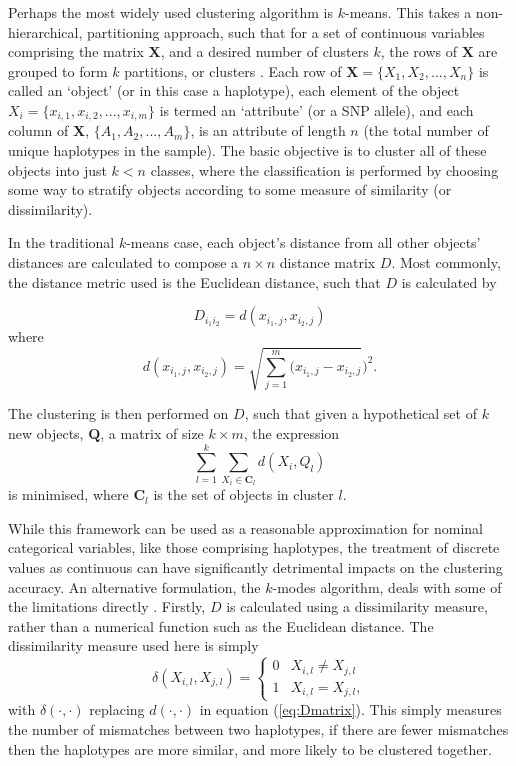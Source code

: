 Perhaps the most widely used clustering algorithm is $k$-means. This takes a non-hierarchical, partitioning approach, such that for a set of continuous variables comprising the matrix $\mathbf{X}$, and a desired number of clusters $k$, the rows of $\mathbf{X}$ are grouped to form $k$ partitions, or clusters \citep{MacQueen1967}. Each row of $\mathbf{X} = \{X_1, X_2, ... , X_n \}$ is called an `object' (or in this case a haplotype), each element of the object $X_i = \{x_{i, 1}, x_{i, 2}, ... , x_{i,m}\}$ is termed an `attribute' (or a SNP allele), and each column of $\mathbf{X}$, $\{A_1, A_2, ..., A_m\}$, is an attribute of length $n$ (the total number of unique haplotypes in the sample). The basic objective is to cluster all of these objects into just $k < n$ classes, where the classification is performed by choosing some way to stratify objects according to some measure of similarity (or dissimilarity).

In the traditional $k$-means case, each object's distance from all other objects' distances are calculated to compose a $n \times n$ distance matrix $D$. Most commonly, the distance metric used is the Euclidean distance, such that $D$ is calculated by

\begin{equation} \label{eq:Dmatrix}
D_{i_{1}i_{2}} = d(x_{i_{1}, j}, x_{i_{2}, j})
\end{equation}
where
\begin{equation}
d(x_{i_{1}, j}, x_{i_{2}, j}) = \sqrt{\sum^{m}_{j=1} ( x_{i_{1}, j} - x_{i_{2}, j}} ) ^{2}.
\end{equation}

The clustering is then performed on $D$, such that given a hypothetical set of $k$ new objects, $\mathbf{Q}$, a matrix of size $k \times m$, the expression
\begin{equation}
\sum^{k}_{l=1} \sum_{X_{i} \in \mathbf{C}_l} d(X_i, Q_l)
\end{equation}
is minimised, where $\mathbf{C}_l$ is the set of objects in cluster $l$.

While this framework can be used as a reasonable approximation for nominal categorical variables, like those comprising haplotypes, the treatment of discrete values as continuous can have significantly detrimental impacts on the clustering accuracy. An alternative formulation, the $k$-modes algorithm, deals with some of the limitations directly \citep{Huang1998}. Firstly, $D$ is calculated using a dissimilarity measure, rather than a numerical function such as the Euclidean distance. The dissimilarity measure used here is simply
\begin{equation}
\delta(X_{i,l}, X_{j,l}) = \left\{
\begin{array}{cc}
0 &  X_{i,l} \neq X_{j,l}\\
1 & X_{i,l} = X_{j,l},
\end{array}\right.
\end{equation}
with $\delta(\cdot, \cdot)$ replacing $d(\cdot, \cdot)$ in equation (\ref{eq:Dmatrix}). This simply measures the number of mismatches between two haplotypes, if there are fewer mismatches then the haplotypes are more similar, and more likely to be clustered together.

